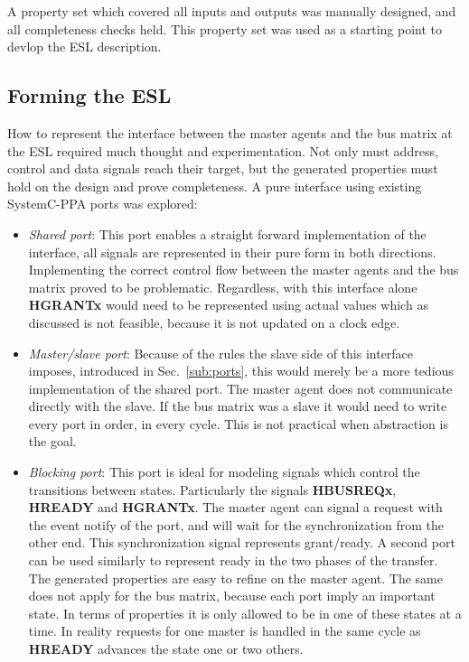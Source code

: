A property set which covered all inputs and outputs was manually designed, and all completeness checks held. This property set was used as a starting point to devlop the ESL description.  

\subsection{Forming the ESL}
How to represent the interface between the master agents and the bus matrix at the ESL required much thought and experimentation. Not only must address, control and data signals reach their target, but the generated properties must hold on the design and prove completeness. A pure interface using existing SystemC-PPA ports was explored: 
\begin{itemize}
  \item \textit{Shared port}: This port enables a straight forward implementation of the interface, all signals are represented in their pure form in both directions. Implementing the correct control flow between the master agents and the bus matrix proved to be problematic. Regardless, with this interface alone
\textbf{HGRANTx} would need to be represented using actual values which as discussed is not feasible, because it is not updated on a clock edge.  
 \item \textit{Master/slave port}: Because of the rules the slave side of this interface imposes, introduced in Sec.~\ref{sub:ports}, this would merely be a more tedious implementation of the shared port. The master agent does not communicate directly with the slave. If the bus matrix was a slave it would need to write every port in order, in every cycle. This is not practical when abstraction is the goal. 
 \item \textit{Blocking port}: This port is ideal for modeling signals which control the transitions between states. Particularly the signals \textbf{HBUSREQx}, 
\textbf{HREADY} and \textbf{HGRANTx}. The master agent can signal a request with the event notify of the port, and will wait for the synchronization from the other end. This synchronization signal represents grant/ready. A second port can be used similarly to represent ready in the two phases of the transfer. The generated properties are easy to refine on the master agent. The same does not apply for the bus matrix, because each port imply an important state. In terms of properties it is only allowed to be in one of these states at a time. In reality requests for one master is handled in the same cycle as \textbf{HREADY} advances the state one or two others.  
\end{itemize}

